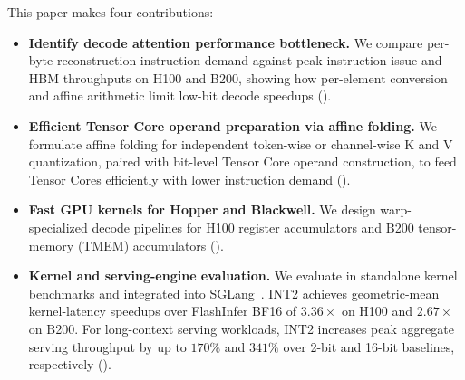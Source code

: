 This paper makes four contributions:
\begin{itemize}
  \item \textbf{Identify decode attention performance bottleneck.}
        We compare per-byte reconstruction instruction demand against peak instruction-issue and HBM throughputs on H100 and B200, showing how per-element conversion and affine arithmetic limit low-bit decode speedups ().
   \item \textbf{Efficient Tensor Core operand preparation via affine folding.}
        We formulate affine folding for independent token-wise or channel-wise K and V quantization, paired with bit-level Tensor Core operand construction, to feed Tensor Cores efficiently with lower instruction demand ().
  \item \textbf{Fast GPU kernels for Hopper and Blackwell.}
        We design warp-specialized decode pipelines for H100 register accumulators and B200 tensor-memory (TMEM) accumulators ().
  \item \textbf{Kernel and serving-engine evaluation.}
        We evaluate \sys{} in standalone kernel benchmarks and integrated into SGLang~\cite{zheng2024sglang}.
        \sys{} INT2 achieves geometric-mean kernel-latency speedups over FlashInfer BF16 of $3.36\times$ on H100 and $2.67\times$ on B200.
        For long-context serving workloads, \sys{} INT2 increases peak aggregate serving throughput by up to $170\%$ and $341\%$ over 2-bit and 16-bit baselines, respectively ().
\end{itemize}
